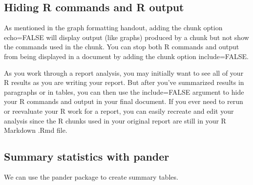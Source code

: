 \documentclass[
]{book}
\newenvironment{Shaded}{\begin{snugshade}}{\end{snugshade}}
\newcommand{\AttributeTok}[1]{\textcolor[rgb]{0.77,0.63,0.00}{#1}}
\newcommand{\CommentTok}[1]{\textcolor[rgb]{0.56,0.35,0.01}{\textit{#1}}}
\newcommand{\FunctionTok}[1]{\textcolor[rgb]{0.00,0.00,0.00}{#1}}
\newcommand{\NormalTok}[1]{#1}
\newcommand{\SpecialCharTok}[1]{\textcolor[rgb]{0.00,0.00,0.00}{#1}}
\newcommand{\StringTok}[1]{\textcolor[rgb]{0.31,0.60,0.02}{#1}}
\begin{document}
\hypertarget{hiding-r-commands-and-r-output}{%
\subsection{Hiding R commands and R output}\label{hiding-r-commands-and-r-output}}

As mentioned in the graph formatting handout, adding the chunk option echo=FALSE will display output (like graphs) produced by a chunk but not show the commands used in the chunk. You can stop both R commands and output from being displayed in a document by adding the chunk option include=FALSE.

As you work through a report analysis, you may initially want to see all of your R results as you are writing your report. But after you've summarized results in paragraphs or in tables, you can then use the include=FALSE argument to hide your R commands and output in your final document. If you ever need to rerun or reevaluate your R work for a report, you can easily recreate and edit your analysis since the R chunks used in your original report are still in your R Markdown .Rmd file.

\hypertarget{summary-statistics-with-pander}{%
\subsection{Summary statistics with pander}\label{summary-statistics-with-pander}}

We can use the pander package to create summary tables.

\begin{Shaded}
\end{Shaded}
\end{document}
